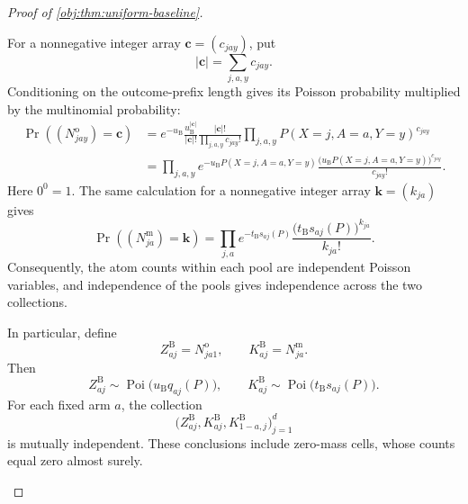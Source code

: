 \documentclass[11pt]{article}
\begin{document}
\begin{proof}[Proof of \cref{obj:thm:uniform-baseline}]
\begin{enumerate}
For a nonnegative integer array
\(\boldsymbol c=(c_{jay})\), put
\[
|\boldsymbol c|=\sum_{j,a,y}c_{jay}.
\]
Conditioning on the outcome-prefix length gives its Poisson probability multiplied by the multinomial probability:
\[
\begin{aligned}
\Pr\!\left((N_{jay}^{\mathrm o})=\boldsymbol c\right)
&=
e^{-u_{\mathrm B}}
\frac{u_{\mathrm B}^{|\boldsymbol c|}}{|\boldsymbol c|!}
\frac{|\boldsymbol c|!}{\prod_{j,a,y}c_{jay}!}
\prod_{j,a,y}
P(X=j,A=a,Y=y)^{c_{jay}}\\
&=
\prod_{j,a,y}
e^{-u_{\mathrm B}P(X=j,A=a,Y=y)}
\frac{
\bigl(u_{\mathrm B}P(X=j,A=a,Y=y)\bigr)^{c_{jay}}
}{c_{jay}!}.
\end{aligned}
\]
Here \(0^0=1\). The same calculation for a nonnegative integer array
\(\boldsymbol k=(k_{ja})\) gives
\[
\Pr\!\left((N_{ja}^{\mathrm m})=\boldsymbol k\right)
=
\prod_{j,a}
e^{-t_{\mathrm B}s_{aj}(P)}
\frac{\bigl(t_{\mathrm B}s_{aj}(P)\bigr)^{k_{ja}}}{k_{ja}!}.
\]
Consequently, the atom counts within each pool are independent Poisson variables, and independence of the pools gives independence across the two collections.

In particular, define
\[
Z_{aj}^{\mathrm B}=N_{ja1}^{\mathrm o},
\qquad
K_{aj}^{\mathrm B}=N_{ja}^{\mathrm m}.
\]
Then
\[
Z_{aj}^{\mathrm B}\sim
\operatorname{Poi}\!\bigl(u_{\mathrm B}q_{aj}(P)\bigr),
\qquad
K_{aj}^{\mathrm B}\sim
\operatorname{Poi}\!\bigl(t_{\mathrm B}s_{aj}(P)\bigr).
\]
For each fixed arm \(a\), the collection
\[
\bigl(Z_{aj}^{\mathrm B},K_{aj}^{\mathrm B},
K_{1-a,j}^{\mathrm B}\bigr)_{j=1}^d
\]
is mutually independent. These conclusions include zero-mass cells, whose counts equal zero almost surely.


\end{enumerate}
\end{proof}
\end{document}
